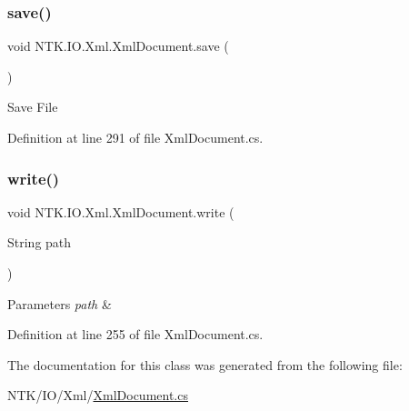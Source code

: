 \mbox{\label{class_n_t_k_1_1_i_o_1_1_xml_1_1_xml_document_a9493c21c61fbe32f2d90f10aa6c0e171}} 
\subsubsection{\texorpdfstring{save()}{save()}}
{\footnotesize\ttfamily void N\+T\+K.\+I\+O.\+Xml.\+Xml\+Document.\+save (\begin{DoxyParamCaption}{ }\end{DoxyParamCaption})}



Save File 



Definition at line 291 of file Xml\+Document.\+cs.

\mbox{\label{class_n_t_k_1_1_i_o_1_1_xml_1_1_xml_document_acdb9149537bb31116fb9a4273d257f8c}} 
\subsubsection{\texorpdfstring{write()}{write()}}
{\footnotesize\ttfamily void N\+T\+K.\+I\+O.\+Xml.\+Xml\+Document.\+write (\begin{DoxyParamCaption}\item[{String}]{path }\end{DoxyParamCaption})}






\begin{DoxyParams}{Parameters}
{\em path} & \\
\hline
\end{DoxyParams}


Definition at line 255 of file Xml\+Document.\+cs.



The documentation for this class was generated from the following file\+:\begin{DoxyCompactItemize}
\item 
N\+T\+K/\+I\+O/\+Xml/\mbox{\hyperlink{_xml_document_8cs}{Xml\+Document.\+cs}}\end{DoxyCompactItemize}
